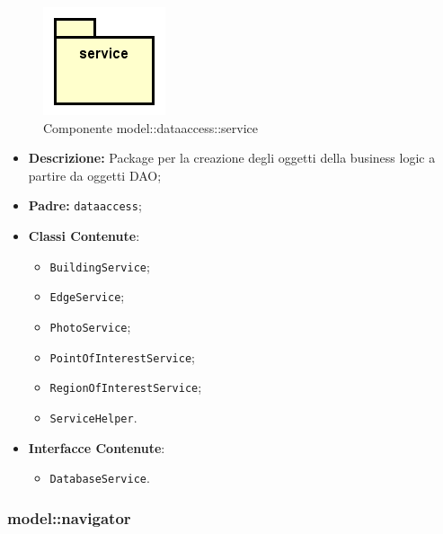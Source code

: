 \documentclass[../DefinizioneDiProdotto.tex]{subfiles}
\begin{document}
\begin{figure}[H]
	\centering
	\includegraphics[width=\maxwidth]{img/package/service.png}
	\caption{Componente model::\-dataaccess::\-service}\label{fig:model::dataaccess::service} 
\end{figure}
\begin{itemize}
	\item \textbf{Descrizione:} Package per la creazione degli oggetti della business logic a partire da oggetti DAO;
	\item \textbf{Padre:} \texttt{dataaccess};
	\item \textbf{Classi Contenute}:
	\begin{itemize}
		\item \texttt{BuildingService};
		
		\item \texttt{EdgeService};
		
		\item \texttt{PhotoService};
		
		\item \texttt{PointOfInterestService};
		
		\item \texttt{RegionOfInterestService};
		
		\item \texttt{ServiceHelper}.
		
	\end{itemize}
	\item \textbf{Interfacce Contenute}:
	\begin{itemize}
		\item \texttt{DatabaseService}.
		
	\end{itemize}
\end{itemize}

\subsubsection{model::\-navigator}
\end{document}

